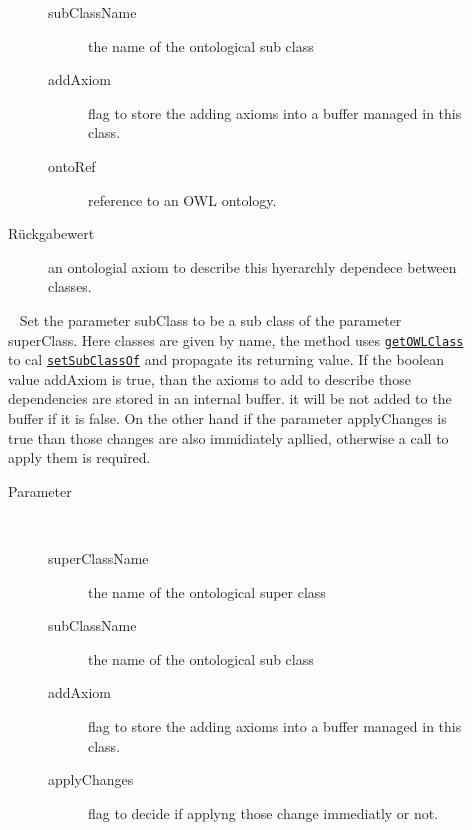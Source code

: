 \begin{description}
\begin{description}
\begin{description}
\item[subClassName]
the name of the ontological sub class
\item[addAxiom]
flag to store the adding axioms into a buffer managed in this class.
\item[ontoRef]
reference to an OWL ontology.
\end{description}
\item[Rückgabewert] 
an ontologial axiom to describe this hyerarchly dependece between classes.
\end{description}
\item[{\ltdHypertarget{ontologyFramework.OFContextManagement.OWLLibrary.setSubClassOf(java.lang.String,java.lang.String,boolean,boolean,ontologyFramework.OFContextManagement.OWLReferences)}{setSubClassOf}\label{ontologyFramework.OFContextManagement.OWLLibrary.setSubClassOf(java.lang.String,java.lang.String,boolean,boolean,ontologyFramework.OFContextManagement.OWLReferences)}}]
~ Set the parameter subClass to be a sub class of the
 parameter superClass. Here classes are given by name, the method
 uses \texttt{\hyperlink{ontologyFramework.OFContextManagement.OWLLibrary.getOWLClass(java.lang.String,ontologyFramework.OFContextManagement.OWLReferences)}{getOWLClass}} to cal
 \texttt{\hyperlink{ontologyFramework.OFContextManagement.OWLLibrary.setSubClassOf(org.semanticweb.owlapi.model.OWLClass,org.semanticweb.owlapi.model.OWLClass,boolean,boolean,ontologyFramework.OFContextManagement.OWLReferences)}{setSubClassOf}} and 
 propagate its returning value. If the boolean value addAxiom is true,
 than the axioms to add to describe those dependencies are stored in an
 internal buffer. it will be not added to the buffer if it is false.
 On the other hand if the parameter applyChanges is true than those changes are also
 immidiately apllied, otherwise a call to apply them
 is required.
\begin{description}
\item[Parameter] ~
\begin{description}
\item[superClassName]
the name of the ontological super class
\item[subClassName]
the name of the ontological sub class
\item[addAxiom]
flag to store the adding axioms into a buffer managed in this class.
\item[applyChanges]
flag to decide if applyng those change immediatly or not.

\end{description}
\end{description}
\end{description}
